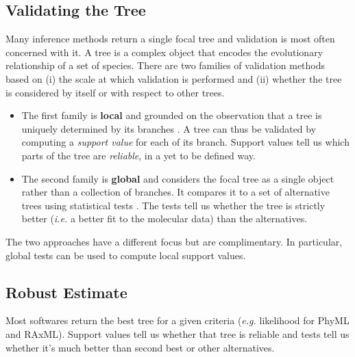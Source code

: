 
\subsection{Validating the Tree} \label{sec:tree-validation}

Many inference methods return a single focal tree and validation is most often concerned with it. A tree is a complex object that encodes the evolutionary relationship of a set of species. There are two families of validation methods based on (i) the scale at which validation is performed and (ii) whether the tree is considered by itself or with respect to other trees. 

\begin{itemize}
 \item The first family is \textbf{local} and grounded on the observation that a tree is uniquely determined by its branches \citep{Buneman1971}. A tree can thus be validated by computing a \emph{support value} for each of its branch. Support values tell us which parts of the tree are \emph{reliable}, in a yet to be defined way. 
 \item The second family is \textbf{global} and considers the focal tree as a single object rather than a collection of branches. It compares it to a set of alternative trees using statistical tests \citep{Shimodaira1999}. The tests tell us whether the tree is strictly better (\emph{i.e.} a better fit to the molecular data) than the alternatives. 
\end{itemize}

The two approaches have a different focus but are complimentary. In particular, global tests can be used to compute local support values. 

\subsection{Robust Estimate} \label{sec:robust-estimate}

Most softwares return the best tree for a given criteria (\emph{e.g.} likelihood for PhyML and RAxML). Support values tell us whether that tree is reliable and tests tell us whether it's much better than second best or other alternatives. 

